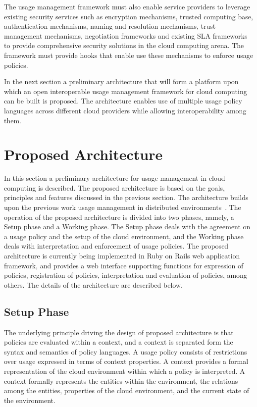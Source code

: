 \documentclass[notitlepage]{book}
\begin{document}
\begin{doublespace}
The usage management framework must also enable service providers to leverage existing security services such as encryption mechanisms, trusted computing base, authentication mechanisms, naming and resolution mechanisms, trust management mechanisms, negotiation frameworks and existing SLA frameworks to provide comprehensive security solutions in the cloud computing arena. The framework must provide hooks that enable use these mechanisms to enforce usage policies. 

In the next section a preliminary architecture that will form a platform upon which an open interoperable usage management framework for cloud computing can be built is proposed. The architecture enables use of multiple usage policy languages across different cloud providers while allowing interoperability among them. 

\section{Proposed Architecture}\label{sec:architecture}
In this section a preliminary architecture for usage management in cloud computing is described. The proposed architecture is based on the goals, principles and features discussed in the previous section. The architecture builds upon the previous work usage management in distributed environments~\cite{JaHeLa:10}.  The operation of the proposed architecture is divided into two phases, namely, a Setup phase and a Working phase. The Setup phase deals with the agreement on a usage policy and the setup of the cloud environment, and the Working phase deals with interpretation and enforcement of usage policies. The proposed architecture is currently being implemented in Ruby on Rails web application framework, and provides a web interface supporting functions for expression of policies, registration of policies, interpretation and evaluation of policies, among others. The details of the architecture are described below.

\subsection{Setup Phase}
The underlying principle driving the design of proposed architecture is that policies are evaluated within a context, and a context is separated form the syntax and semantics of policy languages. A usage policy consists of restrictions over usage expressed in terms of  context properties.  A context provides a formal representation of the cloud environment within which a policy is interpreted. A context formally represents the entities within the environment, the relations among the entities, properties of the cloud environment, and the current state of the environment. 


\end{doublespace}
\end{document}
